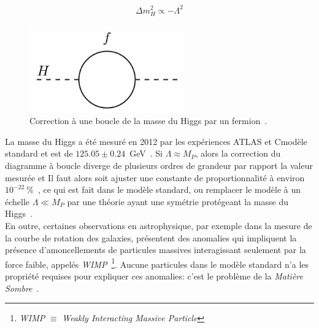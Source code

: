 \begin{eqnarray}
\label{eq:higgs_fermion_corr}
\Delta m_H^2 \propto -\Lambda^2
\end{eqnarray}

\begin{figure}
  \centering
  \includegraphics{higgs-loop.pdf}
  \caption{Correction à une boucle de la masse du Higgs par un
    fermion~\cite{martin_supersymmetry_1997}.}
  \label{fig:hloop}
\end{figure}

La masse du Higgs a été mesuré en 2012 par les expériences ATLAS et
Cmodèle standard et est de
$125.05 \pm 0.24$~GeV~\cite{atlas_collaboration_combined_2015}. Si
$\Lambda \approx M_P$, alors la correction du diagramme à boucle
diverge de plusieurs ordres de grandeur par rapport la valeur mesurée
et Il faut alors soit ajuster une constante de proportionnalité à
environ $10^{-22}~\%$~\cite{giudice_naturally_20087}, ce qui est fait
dans le modèle standard, ou remplacer le modèle à un échelle
$\Lambda \ll M_P$ par une théorie ayant une symétrie protégeant la
masse du
Higgs~\cite{martin_supersymmetry_1997}. \\

En outre, certaines observations en astrophysique, par exemple dans la
mesure de la courbe de rotation des galaxies, présentent des anomalies
qui impliquent la présence d'amoncellements de particules massives
interagissant seulement par la force faible, appelés
\emph{WIMP}~\footnote{\emph{WIMP} $\equiv$ \emph{Weakly Interacting
    Massive Particle}}. Aucune particules dans le modèle standard n'a les propriété
requises pour expliquer ces anomalies: c'est le problème de la
\emph{Matière Sombre}~\cite{bertone_particle_2005}. \\

